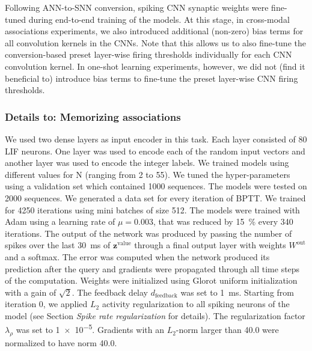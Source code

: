\documentclass{article}
\newcommand{\vm}[1]{\bm{#1}}
\begin{document}
Following ANN-to-SNN conversion, spiking \gls{CNN} synaptic weights were fine-tuned during end-to-end training of the models. At this stage, in cross-modal associations experiments, we also introduced additional (non-zero) bias terms for all convolution kernels in the \glspl{CNN}. Note that this allows us to also fine-tune the conversion-based preset layer-wise firing thresholds individually for each \gls{CNN} convolution kernel. In one-shot learning experiments, however, we did not (find it beneficial to) introduce bias terms to fine-tune the preset layer-wise \gls{CNN} firing thresholds.

\subsubsection*{Details to: Memorizing associations}
We used two dense layers as input encoder in this task. Each layer consisted of \num{80} \gls{LIF} neurons. One layer was used to encode each of the random input vectors and another layer was used to encode the integer labels. We trained models using different values for N (ranging from \num{2} to \num{55}). We tuned the hyper-parameters using a validation set which contained \num{1000} sequences. The models were tested on \num{2000} sequences. We generated a data set for every iteration of \gls{BPTT}. We trained for \num{4250} iterations using mini batches of size \num{512}. The models were trained with Adam \cite{kingma2014adam} using a learning rate of $\mu = 0.003$, that was reduced by \SI{15}{\percent} every \num{340} iterations. The output of the network was produced by passing the number of spikes over the last \SI{30}{ms} of $\vm{z}^\mathrm{value}$ through a final output layer with weights $W^\mathrm{out}$ and a softmax. The error was computed when the network produced its prediction after the query and gradients were propagated through all time steps of the computation. Weights were initialized using Glorot uniform initialization \cite{glorot2010understanding} with a gain of $\sqrt{2}$. The feedback delay $d_{\mathrm{feedback}}$  was set to \SI{1}{ms}. Starting from iteration \num{0}, we applied $L_2$ activity regularization to all spiking neurons of the model (see Section \emph{Spike rate regularization} for details). The regularization factor $\lambda_{\rho}$ was set to \num{1e-5}. Gradients with an $L_2$-norm larger than \num{40.0} were normalized to have norm \num{40.0}.
\end{document}

